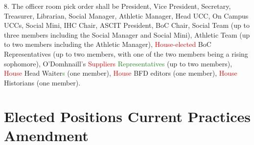 \documentclass[10pt]{article} %
\newcommand{\add}[1]{\textcolor{ForestGreen}{#1}} %
\newcommand{\del}[1]{\textcolor{red}{#1}} %
\newcommand{\swap}[2]{\del{#1} \add{#2}} %
\begin{document}
\begin{itemize}
        8. The officer room pick order shall be President, Vice President, Secretary, Treasurer, Librarian, Social Manager, Athletic Manager, Head UCC, On Campus UCCs, Social Mini, IHC Chair, ASCIT President, BoC Chair, Social Team (up to three members including the Social Manager and Social Mini), Athletic Team (up to two members including the Athletic Manager), \del{House-elected} BoC Representatives (up to two members, with one of the two members being a rising sophomore), O'Domhnaill\del{'}s \swap{Suppliers}{Representatives} (up to two members), \del{House} Head Waiter\add{s} (one member), \del{House} BFD editors (one member), \del{House} Historians (one member).
\end{itemize}

\section{Elected Positions Current Practices Amendment}
\end{document}
